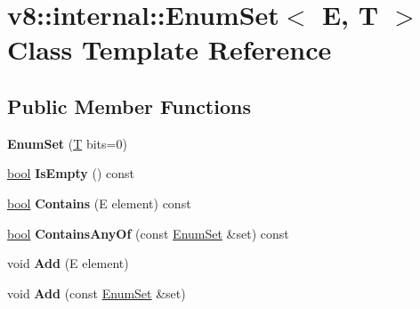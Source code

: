\hypertarget{classv8_1_1internal_1_1EnumSet}{}\section{v8\+:\+:internal\+:\+:Enum\+Set$<$ E, T $>$ Class Template Reference}
\label{classv8_1_1internal_1_1EnumSet}
\subsection*{Public Member Functions}
\begin{DoxyCompactItemize}
\item 
\mbox{\label{classv8_1_1internal_1_1EnumSet_aa49d5338228eb356b622f7e0f2f0d154}} 
{\bfseries Enum\+Set} (\mbox{\hyperlink{classv8_1_1internal_1_1torque_1_1T}{T}} bits=0)
\item 
\mbox{\label{classv8_1_1internal_1_1EnumSet_ad243d2ef6b0eb09348a1d101e8d55607}} 
\mbox{\hyperlink{classbool}{bool}} {\bfseries Is\+Empty} () const
\item 
\mbox{\label{classv8_1_1internal_1_1EnumSet_a5aab128be6f231fcb57030d5cd20d2d7}} 
\mbox{\hyperlink{classbool}{bool}} {\bfseries Contains} (E element) const
\item 
\mbox{\label{classv8_1_1internal_1_1EnumSet_a9e96ec3ba6d17acb8e4dea59e99f7aa9}} 
\mbox{\hyperlink{classbool}{bool}} {\bfseries Contains\+Any\+Of} (const \mbox{\hyperlink{classv8_1_1internal_1_1EnumSet}{Enum\+Set}} \&set) const
\item 
\mbox{\label{classv8_1_1internal_1_1EnumSet_af854cc88381481e5fe5e6550b12fe11d}} 
void {\bfseries Add} (E element)
\item 
\mbox{\label{classv8_1_1internal_1_1EnumSet_a6b035c820d2141ea9da9696becdaaa20}} 
void {\bfseries Add} (const \mbox{\hyperlink{classv8_1_1internal_1_1EnumSet}{Enum\+Set}} \&set)
\item 
\mbox{\label{classv8_1_1internal_1_1EnumSet_a2ebc5126eedda032e601eea6d0024b18}} 

\end{DoxyCompactItemize}
